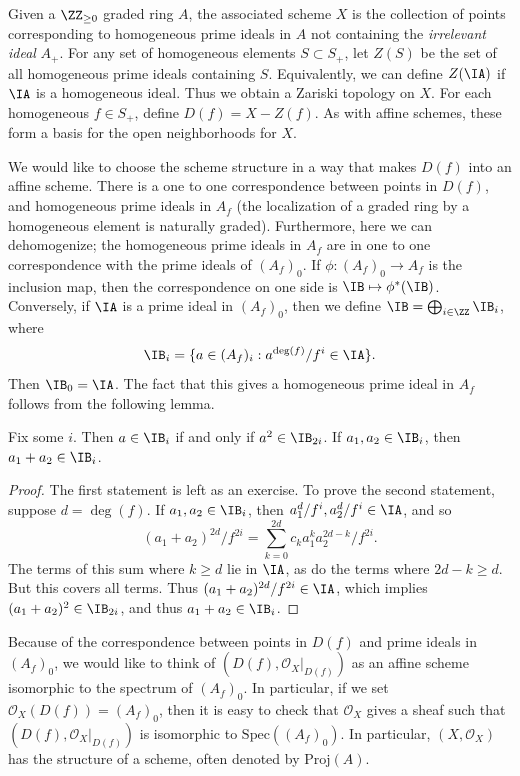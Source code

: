 Given a $\ZZ_{\geq 0}$ graded ring $A$, the associated scheme $X$ is the collection of points corresponding to homogeneous prime ideals in $A$ not containing the \emph{irrelevant ideal} $A_+$. For any set of homogeneous elements $S \subset S_+$, let $Z(S)$ be the set of all homogeneous prime ideals containing $S$. Equivalently, we can define $Z(\IA)$ if $\IA$ is a homogeneous ideal. Thus we obtain a Zariski topology on $X$. For each homogeneous $f \in S_+$, define $D(f) = X - Z(f)$. As with affine schemes, these form a basis for the open neighborhoods for $X$. 

We would like to choose the scheme structure in a way that makes $D(f)$ into an affine scheme. There is a one to one correspondence between points in $D(f)$, and homogeneous prime ideals in $A_f$ (the localization of a graded ring by a homogeneous element is naturally graded). Furthermore, here we can dehomogenize; the homogeneous prime ideals in $A_f$ are in one to one correspondence with the prime ideals of $(A_f)_0$. If $\phi: (A_f)_0 \to A_f$ is the inclusion map, then the correspondence on one side is $\IB \mapsto \phi^*(\IB)$. Conversely, if $\IA$ is a prime ideal in $(A_f)_0$, then we define $\IB = \bigoplus_{i \in \ZZ} \IB_i$, where
%
\[ \IB_i = \{ a \in (A_f)_i : a^{\deg(f)}/f^i \in \IA \}. \]
%
Then $\IB_0 = \IA$. The fact that this gives a homogeneous prime ideal in $A_f$ follows from the following lemma.

\begin{lemma}
    Fix some $i$. Then $a \in \IB_i$ if and only if $a^2 \in \IB_{2i}$. If $a_1,a_2 \in \IB_i$, then $a_1 + a_2 \in \IB_i$.
\end{lemma}
\begin{proof}
    The first statement is left as an exercise. To prove the second statement, suppose $d = \deg(f)$. If $a_1,a_2 \in \IB_i$, then $a_1^d / f^i, a_2^d / f^i \in \IA$, and so
    \[ (a_1 + a_2)^{2d} / f^{2i} = \sum_{k = 0}^{2d} c_k a_1^k a_2^{2d - k} / f^{2i}. \]
    The terms of this sum where $k \geq d$ lie in $\IA$, as do the terms where $2 d - k \geq d$. But this covers all terms. Thus $(a_1 + a_2)^{2 d} / f^{2i} \in \IA$, which implies $(a_1 + a_2)^2 \in \IB_{2i}$, and thus $a_1 + a_2 \in \IB_i$. 
\end{proof}

Because of the correspondence between points in $D(f)$ and prime ideals in $(A_f)_0$, we would like to think of $(D(f),\mathcal{O}_X|_{D(f)})$ as an affine scheme isomorphic to the spectrum of $(A_f)_0$. In particular, if we set $\mathcal{O}_X(D(f)) = (A_f)_0$, then it is easy to check that $\mathcal{O}_X$ gives a sheaf such that $(D(f),\mathcal{O}_X|_{D(f)})$ is isomorphic to $\text{Spec}((A_f)_0)$. In particular, $(X,\mathcal{O}_X)$ has the structure of a scheme, often denoted by $\text{Proj}(A)$.


